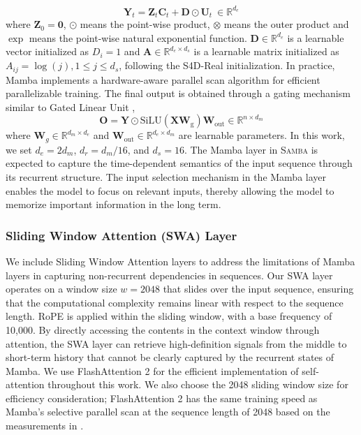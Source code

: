 \documentclass{article}
\begin{document}
\[
\mathbf{Y}_t = \mathbf{Z}_t \mathbf{C}_t  + \mathbf{D} \odot \mathbf{U}_t  ~ \in \mathbb{R}^{d_e}
\]
where $\mathbf{Z}_0 = \mathbf{0}$, $\odot$ means the point-wise product, $\otimes$ means the outer product and $\exp$ means the point-wise natural exponential function. $\mathbf{D} \in \mathbb{R}^{d_e } $ is a learnable vector initialized as $D_i = 1$ and $\mathbf{A} \in \mathbb{R}^{d_e \times d_s}$ is a learnable matrix initialized as $A_{ij} = \log(j), 1\leq j\leq d_s$, following the S4D-Real \citep{s4d} initialization. In practice, Mamba implements a hardware-aware parallel scan algorithm for efficient parallelizable training.
The final output is obtained through a gating mechanism similar to Gated Linear Unit \citep{shazeer2020glu, dauphin2016language},
\[
\mathbf{O} = \mathbf{Y} \odot \text{SiLU}(\mathbf{X} \mathbf{W}_{\text{g}}) \mathbf{W}_{\text{out}} \in \mathbb{R}^{n\times d_m}
\]
where $\mathbf{W}_{g} \in \mathbb{R}^{d_m\times d_e}$ and $\mathbf{W}_{\text{out}} \in \mathbb{R}^{d_e\times d_m}$ are learnable parameters. In this work, we set $d_e = 2 d_m$, $d_r = d_m /16 $, and $d_s = 16$. The Mamba layer in \textsc{Samba} is expected to capture the time-dependent semantics of the input sequence through its recurrent structure. The input selection mechanism in the Mamba layer enables the model to focus on relevant inputs, thereby allowing the model to memorize important information in the long term.

\subsubsection{Sliding Window Attention (SWA) Layer}
We include Sliding Window Attention \citep{beltagy2020longformer} layers to address the limitations of Mamba layers in capturing non-recurrent dependencies in sequences. Our SWA layer operates on a window size $w= 2048$ that slides over the input sequence, ensuring that the computational complexity remains linear with respect to the sequence length. RoPE \citep{su2021roformer} is applied within the sliding window, with a base frequency of 10,000. By directly accessing the contents in the context window through attention, the SWA layer can retrieve high-definition signals from the middle to short-term history that cannot be clearly captured by the recurrent states of Mamba. We use FlashAttention 2 \citep{dao2023flashattention2} for the efficient implementation of self-attention throughout this work. We also choose the 2048 sliding window size for efficiency consideration; FlashAttention 2 has the same training speed as Mamba's 
 selective parallel scan at the sequence length of 2048 based on the measurements in \citep{gu2023mamba}.
\end{document}
